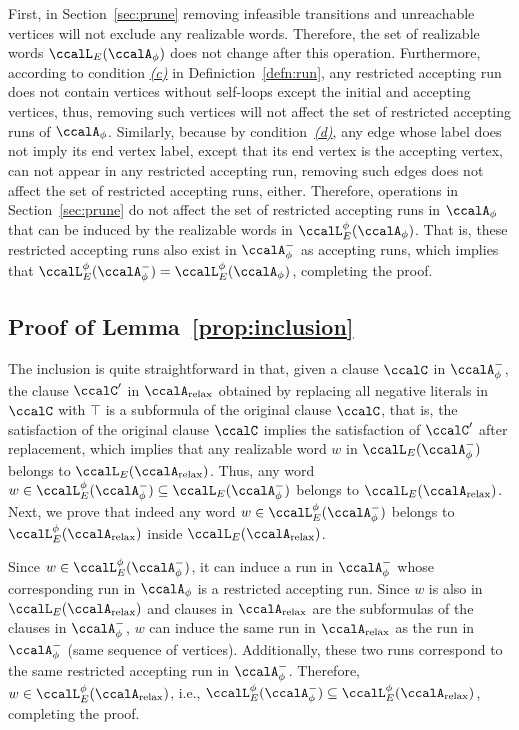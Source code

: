 \documentclass[Afour,sageh,times]{sagej}
\newcommand{\auto}[1]{\ccalA_{\textup{#1}}}
\newcommand{\autop}{\ccalA_{\phi}}
\begin{document}
{{First, in Section~\ref{sec:prune} removing infeasible transitions and unreachable vertices will not exclude any realizable words. Therefore, the set of realizable words $\ccalL_E(\autop)$ does not change after this operation. Furthermore, according to condition \hyperref[cond:c]{\it (c)} in Definiction~\ref{defn:run}, any restricted  accepting run  does not contain vertices without self-loops except the initial and accepting vertices, thus, removing such vertices  will not affect the  set of restricted accepting runs of $\autop$. Similarly, because by condition~\hyperref[cond:d]{\it (d)}, any edge whose label does not imply its end vertex label, except that its end vertex is the accepting vertex,  can not appear in any restricted accepting run, removing such edges does not affect the set of restricted accepting runs, either.  Therefore, operations in Section~\ref{sec:prune}  do not affect the set of restricted accepting runs in $\autop$ that can be induced by the realizable words  in $\ccalL^\phi_E(\autop)$. That is, these restricted accepting runs also exist in $\autop^-$ as accepting runs, which implies that $\ccalL^\phi_E(\autop^-) = \ccalL^\phi_E(\autop)$, completing the proof.


\subsection{Proof of Lemma~\ref{prop:inclusion}}\label{app:inclusion}
The inclusion is quite straightforward in that, given a clause $\ccalC$ in $\autop^-$, the clause $\ccalC'$ in $\auto{relax}$ obtained by replacing all negative literals in $\ccalC$ with $\top$ is a subformula of the original clause $\ccalC$, that is, the satisfaction of the original clause $\ccalC$ implies the satisfaction of $\ccalC'$ after replacement, which implies that any realizable word $w$ in $\ccalL_E(\autop^-)$ belongs to $\ccalL_E(\auto{relax})$. Thus, any word $w \in \ccalL^\phi_E(\autop^-)  \subseteq  \ccalL_E(\autop^-)$ belongs to $\ccalL_E(\auto{relax})$. Next, we prove that indeed any word $w \in \ccalL^\phi_E(\autop^-)$ belongs to  $\ccalL^\phi_E(\auto{relax})$ inside $ \ccalL_E(\auto{relax})$.

Since $w \in \ccalL^\phi_E(\autop^-)$, it can induce  a run in $\autop^-$ whose corresponding run in $\autop$ is a restricted accepting run. Since $w$ is also in $\ccalL_E(\auto{relax})$ and clauses in $\auto{relax}$ are the subformulas of the clauses in $\autop^-$, $w$ can induce the same run in $\auto{relax}$ as the run in $\autop^-$ (same sequence of vertices). Additionally, these two runs correspond to the same restricted accepting run in $\autop^-$. Therefore, $w \in \ccalL^\phi_E(\auto{relax})$, i.e.,  $\ccalL^\phi_E(\autop^-)\subseteq \ccalL^\phi_E(\auto{relax})$, completing the proof.

}}
\end{document}
